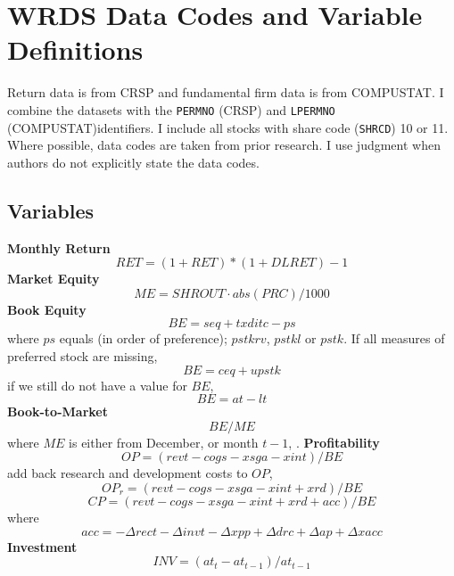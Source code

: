 
\section{WRDS Data Codes and Variable Definitions} \label{sec:datasuppl}

Return data is from CRSP and fundamental firm data is from COMPUSTAT.
I combine the datasets with the \texttt{PERMNO} (CRSP) and \texttt{LPERMNO} 
(COMPUSTAT)identifiers.
I include all stocks with share code (\texttt{SHRCD}) 10 or 11.
Where possible, data codes are taken from prior research.
I use judgment when authors do not explicitly state the data codes.


\subsection{Variables} \label{sec:variables}

\textbf{Monthly Return}
\[RET = (1 + RET) * (1 + DLRET) - 1\]
\textbf{Market Equity}
\[ME = SHROUT \cdot abs(PRC) / 1000\]
\textbf{Book Equity}
\[BE = seq + txditc - ps\]
where $ps$ equals (in order of preference); $pstkrv$, $pstkl$ or $pstk$.
If all measures of preferred stock are missing,
\[BE = ceq + upstk\]
if we still do not have a value for $BE$,
\[BE = at - lt\]
\textbf{Book-to-Market}
\[BE/ME\]
where $ME$ is either from December, \textcite{fama1992cross} or month $t-1$, 
\textcite{asness2013devil}.
\textbf{Profitability}
\[OP = (revt - cogs - xsga - xint)/BE\]
\textcite{fama2016choosing} add back research and development costs to $OP$,
\[OP_r = (revt - cogs - xsga - xint + xrd)/BE\]
\[CP = (revt - cogs - xsga - xint + xrd + acc)/BE\]
where \parencite{ball2016accruals}
\[acc = -\Delta rect -\Delta invt -\Delta xpp +\Delta drc +\Delta ap +\Delta xacc\]
\textbf{Investment}
\[INV = (at_t - at_{t-1})/at_{t-1}\]





